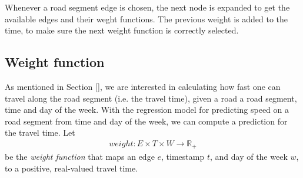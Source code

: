 Whenever a road segment edge is chosen, the next node is expanded to get the available edges and their weght functions. The previous weight is added to the time, to make sure the next weight function is correctly selected. 






\subsection{Weight function}\label{sec:weight-function}
As mentioned in Section \ref{}, we are interested in calculating how fast one can travel along the road segment (i.e. the travel time), given a road a road segment, time and day of the week. With the regression model for predicting speed on a road segment from time and day of the week, we can compute a prediction for the travel time. Let
\begin{align}
weight: E \times T \times W \rightarrow \mathbb{R_+}
\end{align}
be the \emph{weight function} that maps an edge $e$, timestamp $t$, and day of the week $w$, to a positive, real-valued travel time.

